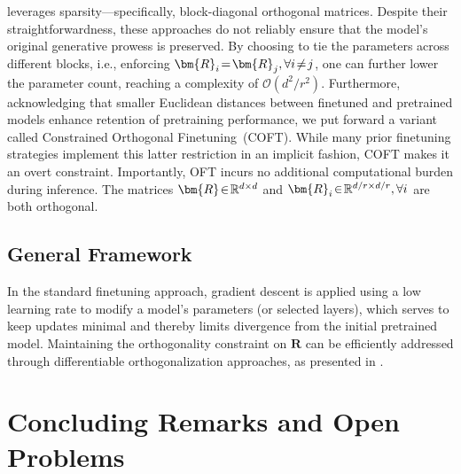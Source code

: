 {leverages sparsity—specifically, block-diagonal orthogonal matrices. Despite their straightforwardness, these approaches do not reliably ensure that the model's original generative prowess is preserved. By choosing to tie the parameters across different blocks, i.e., enforcing $\thickmuskip=2mu \medmuskip=2mu\bm{R}_i=\bm{R}_j,\forall i\neq j$, one can further lower the parameter count, reaching a complexity of $\mathcal{O}(d^2/r^2)$. Furthermore, acknowledging that smaller Euclidean distances between finetuned and pretrained models enhance retention of pretraining performance, we put forward a variant called Constrained Orthogonal Finetuning~(COFT). While many prior finetuning strategies implement this latter restriction in an implicit fashion, COFT makes it an overt constraint. Importantly, OFT incurs no additional computational burden during inference. The matrices $\thickmuskip=2mu \medmuskip=2mu \bm{R}\in\mathbb{R}^{d\times d}$ and $\thickmuskip=2mu \medmuskip=2mu \bm{R}_i\in\mathbb{R}^{d/r\times d/r},\forall i$ are both orthogonal. \subsection{General Framework}

In the standard finetuning approach, gradient descent is applied using a low learning rate to modify a model's parameters (or selected layers), which serves to keep updates minimal and thereby limits divergence from the initial pretrained model. Maintaining the orthogonality constraint on $\bm{R}$ can be efficiently addressed through differentiable orthogonalization approaches, as presented in \cite{liu2021orthogonal,lezcano2019cheap}. \section{Concluding Remarks and Open Problems}

}
